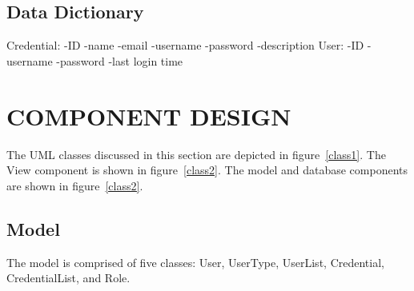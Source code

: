 \documentclass[letterpaper,12pt,oneside,listof=totoc]{scrreprt}
\begin{document}
\section{Data Dictionary}
Credential:\newline
-ID\newline
-name\newline
-email\newline
-username\newline
-password\newline
-description\newline
User:\newline
-ID\newline
-username\newline
-password\newline
-last login time\newline



\chapter{COMPONENT DESIGN}
The UML classes discussed in this section are depicted in figure~\ref{class1}. The View component is shown in figure~\ref{class2}. The model and database components are shown in figure~\ref{class2}.

\section{Model}
The model is comprised of five classes: User, UserType, UserList, Credential, CredentialList, and Role. 
\end{document}

